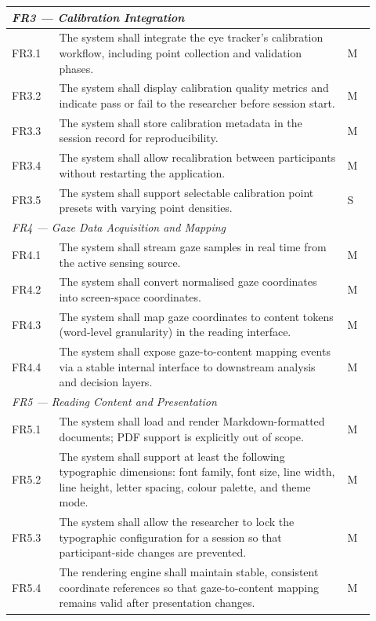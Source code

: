 \begin{longtable}{%
  p{0.12\linewidth}
  p{0.73\linewidth}
  p{0.07\linewidth}
}
\multicolumn{3}{l}{\textit{FR3 — Calibration Integration}} \\
\midrule
FR3.1 & The system shall integrate the eye tracker's calibration workflow,
        including point collection and validation phases. & M \\
FR3.2 & The system shall display calibration quality metrics and indicate
        pass or fail to the researcher before session start. & M \\
FR3.3 & The system shall store calibration metadata in the session record for
        reproducibility. & M \\
FR3.4 & The system shall allow recalibration between participants without
        restarting the application. & M \\
FR3.5 & The system shall support selectable calibration point presets
        with varying point densities. & S \\
\midrule

\multicolumn{3}{l}{\textit{FR4 — Gaze Data Acquisition and Mapping}} \\
\midrule
FR4.1 & The system shall stream gaze samples in real time from the active
        sensing source. & M \\
FR4.2 & The system shall convert normalised gaze coordinates into screen-space
        coordinates. & M \\
FR4.3 & The system shall map gaze coordinates to content tokens
        (word-level granularity) in the reading interface. & M \\
FR4.4 & The system shall expose gaze-to-content mapping events via a stable
        internal interface to downstream analysis and decision layers. & M \\
\midrule

\multicolumn{3}{l}{\textit{FR5 — Reading Content and Presentation}} \\
\midrule
FR5.1 & The system shall load and render Markdown-formatted documents;
        PDF support is explicitly out of scope. & M \\
FR5.2 & The system shall support at least the following typographic
        dimensions: font family, font size, line width, line height,
        letter spacing, colour palette, and theme mode. & M \\
FR5.3 & The system shall allow the researcher to lock the typographic
        configuration for a session so that participant-side changes
        are prevented. & M \\
FR5.4 & The rendering engine shall maintain stable, consistent coordinate
        references so that gaze-to-content mapping remains valid after
        presentation changes. & M \\
\midrule


\end{longtable}
